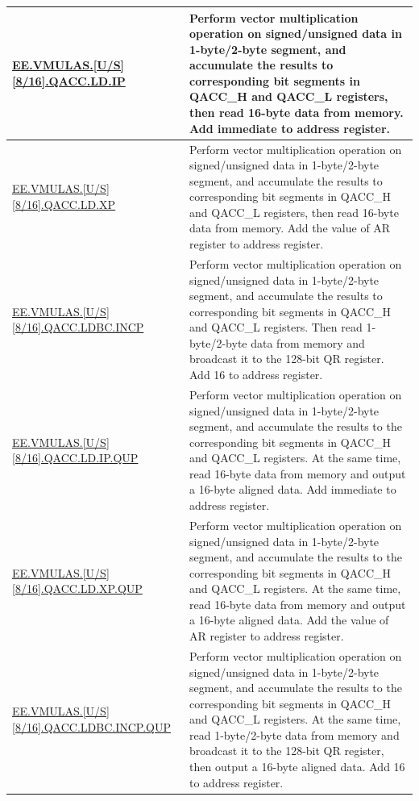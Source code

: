 \begin{longtable}[c]{|l|m{9cm}|}
    \\\hline
    \hyperref[instruction:EEVMULASU8QACCLDIP]{EE.VMULAS.[U/S][8/16].QACC.LD.IP} & Perform vector multiplication operation on signed/unsigned data in 1-byte/2-byte segment, and accumulate the results to corresponding bit segments in QACC\_H and QACC\_L registers, then read 16-byte data from memory. Add immediate to address register.
    \\\hline
    \hyperref[instruction:EEVMULASU8QACCLDXP]{EE.VMULAS.[U/S][8/16].QACC.LD.XP} & Perform vector multiplication operation on signed/unsigned data in 1-byte/2-byte segment, and accumulate the results to corresponding bit segments in QACC\_H and QACC\_L registers, then read 16-byte data from memory. Add the value of AR register to address register.
    \\\hline
    \hyperref[instruction:EEVMULASU8QACCLDBCINCP]{EE.VMULAS.[U/S][8/16].QACC.LDBC.INCP} & Perform vector multiplication operation on signed/unsigned data in 1-byte/2-byte segment, and accumulate the results to corresponding bit segments in QACC\_H and QACC\_L registers. Then read 1-byte/2-byte data from memory and broadcast it to the 128-bit QR register. Add 16 to address register.
    \\\hline
    \hyperref[instruction:EEVMULASU8QACCLDIPQUP]{EE.VMULAS.[U/S][8/16].QACC.LD.IP.QUP} & Perform vector multiplication operation on signed/unsigned data in 1-byte/2-byte segment, and accumulate the results to the corresponding bit segments in QACC\_H and QACC\_L registers. At the same time, read 16-byte data from memory and output a 16-byte aligned data. Add immediate to address register.
    \\\hline
    \hyperref[instruction:EEVMULASU8QACCLDXPQUP]{EE.VMULAS.[U/S][8/16].QACC.LD.XP.QUP} & Perform vector multiplication operation on signed/unsigned data in 1-byte/2-byte segment, and accumulate the results to the corresponding bit segments in QACC\_H and QACC\_L registers. At the same time, read 16-byte data from memory and output a 16-byte aligned data. Add the value of AR register to address register.
    \\\hline
    \hyperref[instruction:EEVMULASU8QACCLDBCINCPQUP]{EE.VMULAS.[U/S][8/16].QACC.LDBC.INCP.QUP} & Perform vector multiplication operation on signed/unsigned data in 1-byte/2-byte segment, and accumulate the results to the corresponding bit segments in QACC\_H and QACC\_L registers. At the same time, read 1-byte/2-byte data from memory and broadcast it to the 128-bit QR register, then output a 16-byte aligned data. Add 16 to address register.
    \\\hline
\end{longtable}